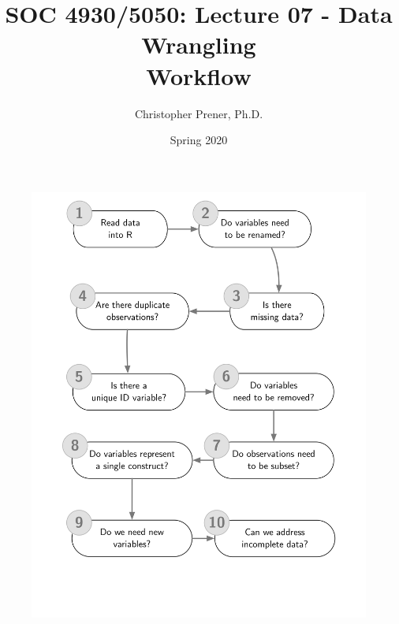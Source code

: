 \documentclass{tufte-handout}
\title{SOC 4930/5050: Lecture 07 - Data Wrangling \\Workflow}
\author{Christopher Prener, Ph.D.}
\date{Spring 2020}
\begin{document}
\maketitle %

\begin{fullwidth}
\begin{figure}[!h]
\includegraphics[scale=.70]{"wrangling"}
\end{figure}
\end{fullwidth}

\end{document}
